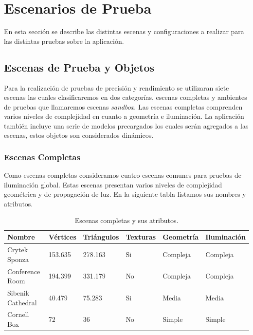 \section{Escenarios de Prueba}

En esta sección se describe las distintas escenas y configuraciones a realizar para las distintas pruebas sobre la aplicación.

\subsection{Escenas de Prueba y Objetos}

Para la realización de pruebas de precisión y rendimiento se utilizaran siete escenas las cuales clasificaremos en dos categorías, escenas completas y ambientes de pruebas que llamaremos escenas \emph{sandbox}. Las escenas completas comprenden varios niveles de complejidad en cuanto a geometría e iluminación. La aplicación también incluye una serie de modelos precargados los cuales serán agregados a las escenas, estos objetos son considerados dinámicos.

\subsubsection{Escenas Completas}

Como escenas completas consideramos cuatro escenas comunes para pruebas de iluminación global. Estas escenas presentan varios niveles de complejidad geométrica y de propagación de luz. En la siguiente tabla listamos sus nombres y atributos.

\begin{table}[h]
\centering
\label{tab:scenes_attributes}
\begin{tabular}{|l|l|l|l|l|l|}
\hline
Nombre            & Vértices & Triángulos & Texturas & Geometría & Iluminación \\ \hline
Crytek Sponza     & 153.635  & 278.163    & Si       & Compleja  & Compleja     \\ \hline
Conference Room   & 194.399  & 331.179    & No       & Compleja  & Compleja     \\ \hline
Sibenik Cathedral & 40.479   & 75.283     & Si       & Media     & Media        \\ \hline
Cornell Box       & 72       & 36         & No       & Simple    & Simple       \\ \hline
\end{tabular}
\caption{Escenas completas y sus atributos.}
\end{table}

